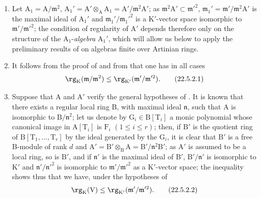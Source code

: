 \begin{remark}[22.5.2]
\label{0.22.5.2}
\begin{enumerate}
  \item[\rm{(i)}] Let $\mathrm{A}_1=\mathrm{A}/\mathfrak{m}^2$, $\mathrm{A}_1'=\mathrm{A}'\otimes_\mathrm{A}\mathrm{A}_1=\mathrm{A}'/\mathfrak{m}^2\mathrm{A}'$; as $\mathfrak{m}^2\mathrm{A}'\subset\mathfrak{m}'^2$, $\mathfrak{m}_1'=\mathfrak{m}'/\mathfrak{m}^2\mathrm{A}'$ is the maximal ideal of $\mathrm{A}_1'$ and $\mathfrak{m}_1'/\mathfrak{m}_1'^2$ is a $\mathrm{K}'$-vector space isomorphic to $\mathfrak{m}'/\mathfrak{m}'^2$; the condition of regularity of $\mathrm{A}'$ depends therefore only on the structure of the $\mathrm{A}_1$-\emph{algebra} $\mathrm{A}_1'$, which will allow us below to apply the preliminary results of  on algebras finite over Artinian rings.
  \item[\rm{(ii)}] It follows from the proof of  and from  that one has in all cases
\[
\label{0.22.5.2.1}
  \rg_\mathrm{K}(\mathfrak{m}/\mathfrak{m}^2)\leq\rg_{\mathrm{K}'}(\mathfrak{m}'/\mathfrak{m}'^2).
  \tag{22.5.2.1}
\]
  \item[\rm{(iii)}] Suppose that $\mathrm{A}$ and $\mathrm{A}'$ verify the general hypotheses of .
  It is known  that there exists a regular local ring $\mathrm{B}$, with maximal ideal $\mathfrak{n}$, such that $\mathrm{A}$ is isomorphic to $\mathrm{B}/\mathfrak{n}^2$; let us denote by $\mathrm{G}_i\in\mathrm{B}[\mathrm{T}_i]$ a monic polynomial whose canonical image in $\mathrm{A}[\mathrm{T}_i]$ is $\mathrm{F}_i$ $(1\leq i\leq r)$; then, if $\mathrm{B}'$ is the quotient ring of $\mathrm{B}[\mathrm{T}_1,\ldots,\mathrm{T}_r]$ by the ideal generated by the $\mathrm{G}_i$, it is clear that $\mathrm{B}'$ is a free $\mathrm{B}$-module of rank $d$ and $\mathrm{A}'=\mathrm{B}'\otimes_\mathrm{B}\mathrm{A}=\mathrm{B}'/\mathfrak{n}^2\mathrm{B}'$; as $\mathrm{A}'$ is assumed to be a local ring, so is $\mathrm{B}'$, and if $\mathfrak{n}'$ is the maximal ideal of $\mathrm{B}'$, $\mathrm{B}'/\mathfrak{n}'$ is isomorphic to $\mathrm{K}'$ and $\mathfrak{n}'/\mathfrak{n}'^2$ is isomorphic to $\mathfrak{m}'/\mathfrak{m}'^2$ as a $\mathrm{K}'$-vector space;
  the inequality  shows thus that we have, under the hypotheses of 
\[
\label{0.22.5.2.2}
  \rg_\mathrm{K}(\mathrm{V})\leq\rg_{\mathrm{K}'}(\mathfrak{m}'/\mathfrak{m}'^2).
  \tag{22.5.2.2}
\]
\end{enumerate}
\end{remark}


